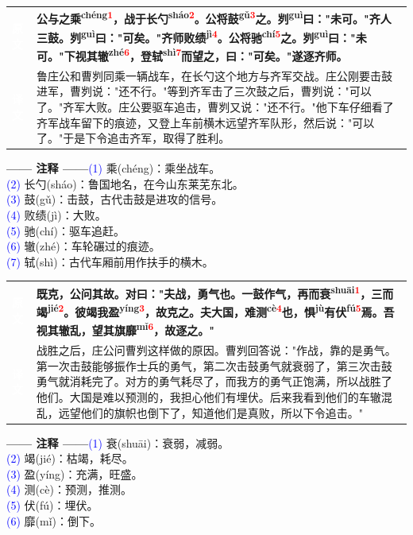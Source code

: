 \documentclass[a4paper,12pt]{ctexart}
\makeatletter
\newcommand{\ruby}[2]{#1\textsuperscript{#2}}
\newlength{\colA}\setlength{\colA}{0.06\textwidth}
\newlength{\colB}\setlength{\colB}{0.64\textwidth}
\newlength{\colC}\setlength{\colC}{0.26\textwidth}
\newcommand{\sectab}[3]{%
  \noindent
  \begin{minipage}[c]{\dimexpr\colA+\colB+2\tabcolsep\relax}
  \begin{tabular}{@{}p{\colA}p{\colB}@{}}
  \sideyuan  & {\large\bfseries #1} \\
  \sideyiwen & {\large #2} \\
  \end{tabular}
  \end{minipage}
  \hfill
  \begin{minipage}[c]{\colC}
  {\labelann\vspace{0.1cm}}#3
  \end{minipage}
  \par
}
\newcommand{\sideyuan}{\colorbox{blue!70!black}{\textcolor{white}{\normalsize\textbf{原文}}}}
\newcommand{\sideyiwen}{\colorbox{green!60!black}{\textcolor{white}{\normalsize\textbf{译文}}}}
\newcommand{\labelann}{\textcolor{orange!80!black}{\small\textbf{—— 注释 ——}}}
\newcommand{\refmark}[1]{\textsuperscript{\textcolor{red}{#1}}}
\makeatother
\begin{document}
\vspace{0.3cm}
\sectab{公与之\ruby{乘}{chéng}\refmark{1}，战于长\ruby{勺}{sháo}\refmark{2}。公将\ruby{鼓}{gǔ}\refmark{3}之。\ruby{刿}{guì}曰："未可。"齐人三鼓。\ruby{刿}{guì}曰："可矣。"齐师败\ruby{绩}{jì}\refmark{4}。公将\ruby{驰}{chí}\refmark{5}之。\ruby{刿}{guì}曰："未可。"下视其\ruby{辙}{zhé}\refmark{6}，登\ruby{轼}{shì}\refmark{7}而望之，曰："可矣。"遂逐齐师。}{鲁庄公和曹刿同乘一辆战车，在长勺这个地方与齐军交战。庄公刚要击鼓进军，曹刿说："还不行。"等到齐军击了三次鼓之后，曹刿说："可以了。"齐军大败。庄公要驱车追击，曹刿又说："还不行。"他下车仔细看了齐军战车留下的痕迹，又登上车前横木远望齐军队形，然后说："可以了。"于是下令追击齐军，取得了胜利。}{{\small \textcolor{blue}{(1)} 乘(chéng)：乘坐战车。}\\[0.1cm]{\small \textcolor{blue}{(2)} 长勺(sháo)：鲁国地名，在今山东莱芜东北。}\\[0.1cm]{\small \textcolor{blue}{(3)} 鼓(gǔ)：击鼓，古代击鼓是进攻的信号。}\\[0.1cm]{\small \textcolor{blue}{(4)} 败绩(jì)：大败。}\\[0.1cm]{\small \textcolor{blue}{(5)} 驰(chí)：驱车追赶。}\\[0.1cm]{\small \textcolor{blue}{(6)} 辙(zhé)：车轮碾过的痕迹。}\\[0.1cm]{\small \textcolor{blue}{(7)} 轼(shì)：古代车厢前用作扶手的横木。}}

\vspace{0.3cm}
\sectab{既克，公问其故。对曰："夫战，勇气也。一鼓作气，再而\ruby{衰}{shuāi}\refmark{1}，三而\ruby{竭}{jié}\refmark{2}。彼竭我\ruby{盈}{yíng}\refmark{3}，故克之。夫大国，难\ruby{测}{cè}\refmark{4}也，\ruby{惧}{jù}有\ruby{伏}{fú}\refmark{5}焉。吾视其辙乱，望其旗\ruby{靡}{mǐ}\refmark{6}，故逐之。"}{战胜之后，庄公问曹刿这样做的原因。曹刿回答说："作战，靠的是勇气。第一次击鼓能够振作士兵的勇气，第二次击鼓勇气就衰弱了，第三次击鼓勇气就消耗完了。对方的勇气耗尽了，而我方的勇气正饱满，所以战胜了他们。大国是难以预测的，我担心他们有埋伏。后来我看到他们的车辙混乱，远望他们的旗帜也倒下了，知道他们是真败，所以下令追击。"}{{\small \textcolor{blue}{(1)} 衰(shuāi)：衰弱，减弱。}\\[0.1cm]{\small \textcolor{blue}{(2)} 竭(jié)：枯竭，耗尽。}\\[0.1cm]{\small \textcolor{blue}{(3)} 盈(yíng)：充满，旺盛。}\\[0.1cm]{\small \textcolor{blue}{(4)} 测(cè)：预测，推测。}\\[0.1cm]{\small \textcolor{blue}{(5)} 伏(fú)：埋伏。}\\[0.1cm]{\small \textcolor{blue}{(6)} 靡(mǐ)：倒下。}}
\end{document}

